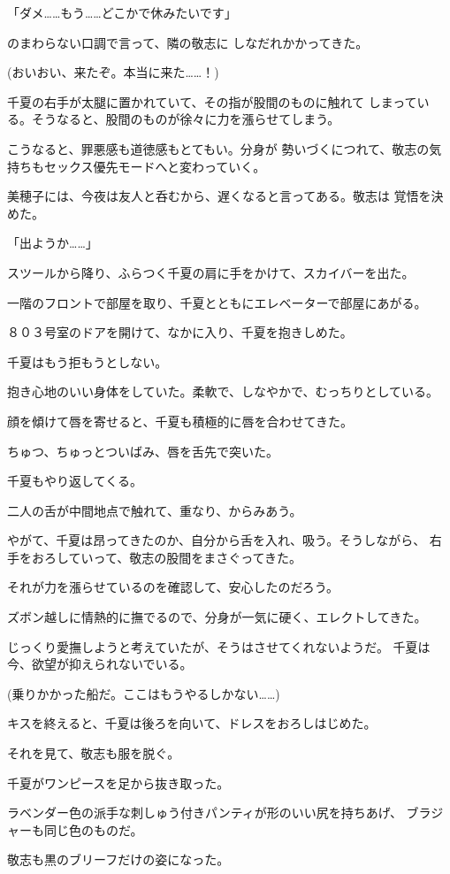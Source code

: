 ﻿\documentclass[
    book,tate,
    line_length=30zw,
    jafontsize=12pt,
    paper=b5j,
    landscape,
    ]{jlreq}
\begin{document}
「ダメ……もう……どこかで休みたいです」

のまわらない口調で言って、隣の敬志に
しなだれかかってきた。

(おいおい、来たぞ。本当に来た……！)

千夏の右手が太腿に置かれていて、その指が股間のものに触れて
しまっている。そうなると、股間のものが徐々に力を漲らせてしまう。

こうなると、罪悪感も道徳感もとてもい。分身が
勢いづくにつれて、敬志の気持ちもセックス優先モードへと変わっていく。

美穂子には、今夜は友人と呑むから、遅くなると言ってある。敬志は
覚悟を決めた。

「出ようか……」

スツールから降り、ふらつく千夏の肩に手をかけて、スカイバーを出た。

一階のフロントで部屋を取り、千夏とともにエレベーターで部屋にあがる。

８０３号室のドアを開けて、なかに入り、千夏を抱きしめた。

千夏はもう拒もうとしない。

抱き心地のいい身体をしていた。柔軟で、しなやかで、むっちりとしている。

顔を傾けて唇を寄せると、千夏も積極的に唇を合わせてきた。

ちゅつ、ちゅっとついばみ、唇を舌先で突いた。

千夏もやり返してくる。

二人の舌が中間地点で触れて、重なり、からみあう。

やがて、千夏は昂ってきたのか、自分から舌を入れ、吸う。そうしながら、
右手をおろしていって、敬志の股間をまさぐってきた。

それが力を漲らせているのを確認して、安心したのだろう。

ズボン越しに情熱的に撫でるので、分身が一気に硬く、エレクトしてきた。

じっくり愛撫しようと考えていたが、そうはさせてくれないようだ。
千夏は今、欲望が抑えられないでいる。

(乗りかかった船だ。ここはもうやるしかない……)

キスを終えると、千夏は後ろを向いて、ドレスをおろしはじめた。

それを見て、敬志も服を脱ぐ。

千夏がワンピースを足から抜き取った。

ラベンダー色の派手な刺しゅう付きパンティが形のいい尻を持ちあげ、
ブラジャーも同じ色のものだ。

敬志も黒のブリーフだけの姿になった。
\end{document}
